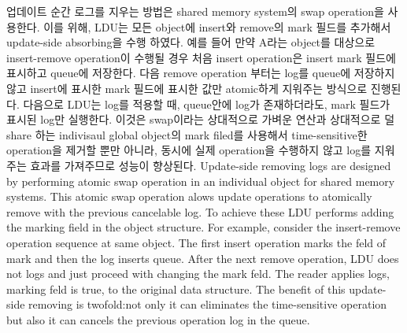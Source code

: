 \ifkor
업데이트 순간 로그를 지우는 방법은 shared memory system의 swap operation을 사용한다.
이를 위해, LDU는 모든 object에 insert와 remove의 mark 필드를 추가해서 update-side
absorbing을 수행 하였다.
예를 들어 만약 A라는 object를 대상으로 insert-remove operation이 수행될 경우 처음 insert operation은
insert mark 필드에 표시하고 queue에 저장한다.
다음 remove operation 부터는 log를 queue에 저장하지 않고 insert에 표시한 mark 필드에 표시한 값만
atomic하게 지워주는 방식으로 진행된다.
다음으로 LDU는 log를 적용할 때, queue안에 log가 존재하더라도, mark 필드가 표시된 log만 실행한다.
이것은 swap이라는 상대적으로 가벼운 연산과 상대적으로 덜 share 하는 indivisaul global object의 mark filed를
사용해서 time-sensitive한 operation을 제거할 뿐만 아니라, 동시에 실제 operation을 수행하지 않고 log를 지워주는
효과를 가져주므로 성능이 향상된다. 
\else
Update-side removing logs are designed by performing atomic swap operation
in an individual object for shared memory systems.
This atomic swap operation alows update operations to atomically remove with the
previous cancelable log.
To achieve these LDU performs adding the marking field in the object structure.
For example, consider the insert-remove operation sequence at same object.
The first insert operation marks the feld of mark and then the log inserts
queue.
After the next remove operation, LDU does not logs and just proceed with
changing the mark feld.
The reader applies logs, marking feld is true, to the original data structure.
The benefit of this update-side removing is twofold:not only it can eliminates
the time-sensitive operation but also it can cancels the previous operation log
in the queue.
\fi


